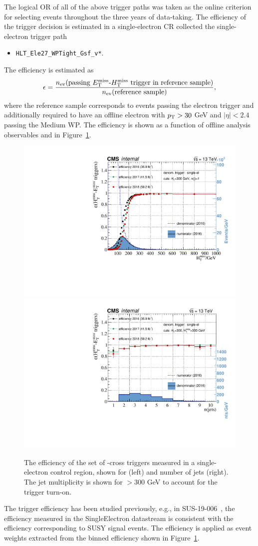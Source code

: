The logical OR of all of the above trigger paths was taken as the online criterion for selecting events throughout the three years of
data-taking.  The efficiency of the trigger decision is estimated in a single-electron CR collected the single-electron trigger path
\begin{itemize}
\item \texttt{HLT\_Ele27\_WPTight\_Gsf\_v*}.
\end{itemize}
The efficiency is estimated as
\begin{equation}
\epsilon = \frac{ n_{\text{ev}}(\text{passing \MET-\mht trigger in reference sample}) }{n_{\text{ev}}(\text{reference sample})},
\end{equation}
where the reference sample corresponds to events passing the electron trigger and additionally required to have an offline electron with $p_{\mathrm{T}}>30$ GeV and $|\eta|<2.4$ passing the Medium WP. The efficiency is shown as a function of offline analysis observables \mht and \njets in Figure~\ref{fig:main-trigger-real-met}.

\begin{figure}[]
\centering
\includegraphics[width=0.48\linewidth]{plots/trigger/TrigEffMht.pdf}
\includegraphics[width=0.48\linewidth]{plots/trigger/TrigEffNJets.pdf}
\caption[The efficiency of the set of \MET-\mht cross triggers]{The efficiency of the set of \MET-\mht cross triggers measured in a single-electron control region, shown for \mht (left) and number of jets (right). The jet multiplicity is shown for \mht$>300$ GeV to account for the trigger turn-on.
  }
\label{fig:main-trigger-real-met}
\end{figure}

The trigger efficiency has been studied previously, e.g., in SUS-19-006~\cite{CMS-PAS-SUS-19-006}, the efficiency measured in the SingleElectron datastream is consistent with the efficiency corresponding to SUSY signal events. The efficiency is applied as event weights extracted from the binned efficiency shown in Figure~\ref{fig:main-trigger-real-met}.



